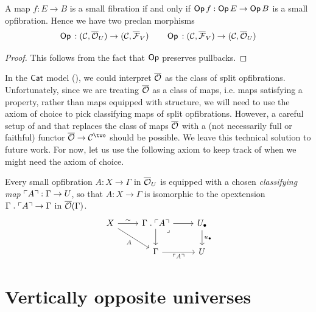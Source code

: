 \begin{proposition}\label{prop:op-preclan-morphism-small}
  A map $f : E \to B$ is a small fibration if and only if
  $\mathop{\mathsf{Op}}{f} : \mathop{\mathsf{Op}}{E} \to \mathop{\mathsf{Op}}{B}$ is a small opfibration.
  Hence we have two preclan morphisms
  \[ \mathop{\mathsf{Op}}{} : (\mathcal{C}, {\overline{{\mathcal{O}}}}_U) \to (\mathcal{C}, {\overline{{\mathcal{F}}}}_V)
  \quad \quad
  \mathop{\mathsf{Op}}{} : (\mathcal{C}, {\overline{{\mathcal{F}}}}_V) \to (\mathcal{C}, {\overline{{\mathcal{O}}}}_U) \]
\end{proposition}
\begin{proof}
  This follows from the fact that $\mathop{\mathsf{Op}}$ preserves pullbacks.
\end{proof}

In the $\mathsf{Cat}$ model (),
we could interpret ${\overline{{\mathcal{O}}}}$ as the class of split opfibrations.
Unfortunately,
since we are treating ${\overline{{\mathcal{O}}}}$ as a class of maps,
i.e. maps satisfying a property,
rather than maps equipped with structure, 
we will need to use the axiom of choice
to pick classifying maps of split opfibrations.
However, a careful setup of 
and 
that replaces the class of maps ${\overline{{\mathcal{O}}}}$ with a
(not necessarily full or faithful)
functor $\opfib \to \CC^\two$ should be possible.
We leave this technical solution to future work.
For now, let us use the following axiom to keep track of when we might need
the axiom of choice.

\begin{axiom}\label{ax:classifying-map}
  Every small opfibration $A : X \to \Gamma$ in ${\overline{{\mathcal{O}}}}_U$
  is equipped with a chosen \emph{classifying map}
  $\ulcorner A \urcorner : \Gamma \to U$,
  so that $A : X \to \Gamma$ is isomorphic to the opextension
  $\Gamma \mathrel{.} \ulcorner A \urcorner \to \Gamma$ in ${\overline{{\mathcal{O}}}}(\Gamma)$.
  \[ \begin{tikzcd}
      X & {\Gamma \opext \ulcorner A \urcorner} & \Ulow \\
      & \Gamma & \U
      \arrow["\sim", from=1-1, to=1-2]
      \arrow["A"', from=1-1, to=2-2]
      \arrow[from=1-2, to=1-3]
      \arrow[from=1-2, to=2-2]
      \arrow["\lrcorner"{anchor=center, pos=0.125}, draw=none, from=1-2, to=2-3]
      \arrow["\ulow", from=1-3, to=2-3]
      \arrow["{\ulcorner A \urcorner}"', from=2-2, to=2-3]
    \end{tikzcd} \]
\end{axiom}

\section*{Vertically opposite universes}

